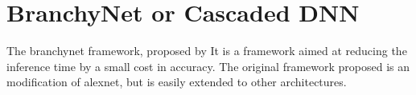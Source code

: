 \section{BranchyNet or Cascaded DNN}

The \gls{branchynet} framework, proposed by \citeauthor{teerapittayanon_branchynet:_2016} It is a framework aimed at reducing the inference time by a small cost in accuracy. The original framework proposed is an modification of \gls{alexnet}, but is easily extended to other architectures. 

\begin{figure}
	\centering

\end{figure}
